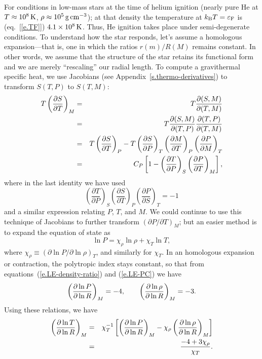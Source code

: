For conditions in low-mass stars at the time of helium ignition (nearly pure He at $T \approx 10^{8}\,\mathrm{K}$, $\rho \approx 10^{5}\,\mathrm{g}\,{\mathrm{c}\mathrm{m}}^{-3}$); at that density the temperature at $k_\mathrm{B} T = \varepsilon_{\mathrm{F}}$ is (eq.~[\ref{e.TF}]) $4.1\times 10^{8}\,\mathrm{K}$.  Thus, He ignition takes place under semi-degenerate conditions.  To understand how the star responds, let's assume a homologous expansion---that is, one in which the ratios $r(m)/R(M)$ remains constant.  In other words, we assume that the structure of the star retains its functional form and we are merely ``rescaling'' our radial length.  To compute a gravithermal specific heat, we use Jacobians (see Appendix~\ref{s.thermo-derivatives}) to transform $S(T,P)$ to $S(T,M)$:
\begin{eqnarray}\label{e.homologous-cstar}
T\left(\frac{\partial S}{\partial T}\right)_{M} &=& T\frac{\partial(S,M)}{\partial(T,M)}\nonumber \\
 &=& T\frac{\partial(S,M)}{\partial(T,P)}\frac{\partial(T,P)}{\partial(T,M)}\nonumber \\
 &=& T\left(\frac{\partial S}{\partial T}\right)_{P} - T\left(\frac{\partial S}{\partial P}\right)_{T}\left(\frac{\partial M}{\partial T}\right)_{P}\left(\frac{\partial P}{\partial M}\right)_{T}\nonumber \\
 &=& C_{P}\left[ 1 - \left(\frac{\partial T}{\partial P}\right)_{S}\left(\frac{\partial P}{\partial T}\right)_{M}\right],
\end{eqnarray}
where in the last identity we have used 
\[
 	\left(\frac{\partial T}{\partial P}\right)_{S} 
 	\left(\frac{\partial S}{\partial T}\right)_{P} 
 	\left(\frac{\partial P}{\partial S}\right)_{T} = -1
\]
and a similar expression relating $P$, $T$, and $M$. We could continue to use this technique of Jacobians to further transform $(\partial P/\partial T)_{M}$; but an easier method is to expand the equation of state as
\begin{equation}\label{e.eos-logarithmic}
\ln P = \chi_{\rho}\ln\rho + \chi_{T}\ln T,
\end{equation}
where $\chi_{\rho} \equiv (\partial\ln P/\partial\ln \rho)_{T}$, and similarly for $\chi_{T}$.  In an homologous expansion or contraction, the polytropic index stays constant, so that from equations~(\ref{e.LE-density-ratio}) and (\ref{e.LE-PC}) we have
\begin{equation}\label{e.homologous-eos-changes}
\left(\frac{\partial \ln P}{\partial \ln R}\right)_{M} = -4,\qquad \left(\frac{\partial \ln\rho}{\partial \ln R}\right)_{M} = -3.
\end{equation}
Using these relations, we have
\begin{eqnarray*}
 \left(\frac{\partial \ln T}{\partial \ln R}\right)_{M} &=& \chi_{T}^{-1}\left[\left(\frac{\partial \ln P}{\partial \ln R}\right)_{M} - \chi_{\rho}\left(\frac{\partial \ln\rho}{\partial \ln R}\right)_{M}\right]\\
   &=& \frac{-4 + 3\chi_{\rho}}{\chi_{T}}.
\end{eqnarray*}
